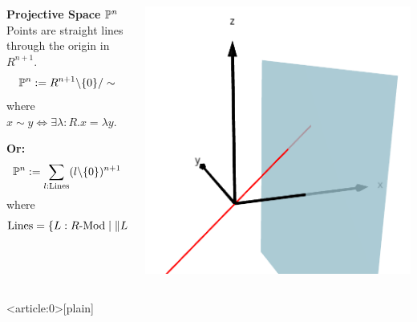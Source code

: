 \documentclass{beamer}
\begin{document}
\begin{frame}
  \begin{columns}
    \begin{column}{0.5\textwidth}
      \textbf{Projective Space} $\mathbb{P}^n$ \\
      Points are straight lines through the origin in $R^{n+1}$.
      \[ \mathbb{P}^n:= R^{n+1}\text{\textbackslash}\{0\}/\sim \]
      where $x\sim y \Leftrightarrow \exists \lambda :R. x=\lambda y$. 

      \vspace{1em}
      \textbf{Or:}
      \[ \mathbb{P}^n:= \sum_{l:\mathrm{Lines}}(l\text{\textbackslash}\{0\})^{n+1} \]
      where
      \[\mathrm{Lines}=\{L:R\text{-}\mathrm{Mod}\mid \|L=R^1\|\}=K(R^\times,1)\]
    \end{column}

    \begin{column}{0.5\textwidth}
      \includegraphics[width=\textwidth]{projective-space.png}
    \end{column}
  \end{columns}
\end{frame}

{ %
    \begin{frame}<article:0>[plain]
     \end{frame}
}
\end{document}
